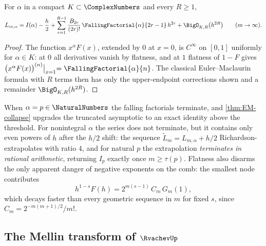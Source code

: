 \begin{theorem}
\label{thm:complex-EM}
For $\alpha$ in a compact $K\subset\ComplexNumbers$ and every $R\ge1$,
\begin{equation}
 L_{m,\alpha}
 =I(\alpha)-\frac h2
 +\sum_{r=1}^{R-1}\frac{B_{2r}}{(2r)!}\,
 \FallingFactorial{\alpha}{2r-1}\,h^{2r}
 +\BigO_{K,R}\bigl(h^{2R}\bigr)
 \qquad(m\to\infty).
 \label{eq:complex-EM}
\end{equation}
\end{theorem}

\begin{proof}
The function $x^{\alpha}F(x)$, extended by $0$ at $x=0$, is
$C^\infty$ on $[0,1]$ uniformly for $\alpha\in K$: at $0$ all
derivatives vanish by flatness, and at $1$ flatness of $1-F$ gives
$\bigl(x^{\alpha}F(x)\bigr)^{(n)}\bigl|_{x=1}=\FallingFactorial{\alpha}{n}$.  The
classical Euler--Maclaurin formula with $R$ terms then has only the
upper-endpoint corrections shown and a remainder
$\BigO_{K,R}(h^{2R})$.
\end{proof}

When $\alpha=p\in\NaturalNumbers$ the falling factorials terminate, and
\cref{thm:EM-collapse} upgrades the truncated asymptotic to an exact
identity above the threshold.  For nonintegral $\alpha$ the series
does not terminate, but it contains only even powers of $h$ after the
$h/2$ shift: the sequence
$\widetilde L_m=L_{m,\alpha}+h/2$ Richardson-extrapolates with ratio
$4$, and for natural $p$ the extrapolation \emph{terminates in
rational arithmetic}, returning $I_p$ exactly once $m\ge\tau(p)$.
Flatness also disarms the only apparent danger of negative exponents
on the comb: the smallest node contributes
\begin{equation}
 h^{1-s}F(h)
 =2^{m(s-1)}\,C_m\,G_m(1),
 \label{eq:first-node}
\end{equation}
which decays faster than every geometric sequence in $m$ for fixed
$s$, since $C_m=2^{-m(m+1)/2}/m!$.

\subsection{The Mellin transform of \texorpdfstring{$\RvachevUp$}{up}}
\label{sec:mellin-up}

